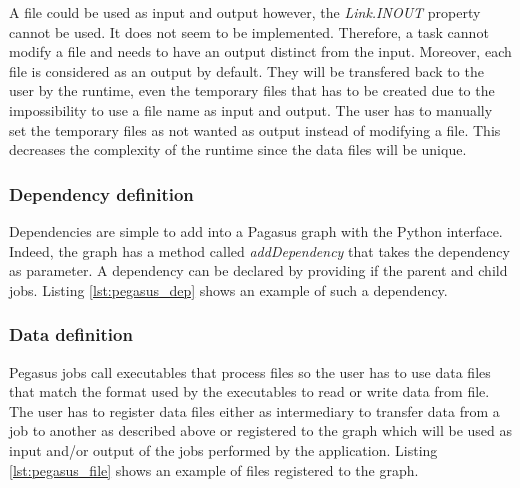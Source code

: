 A file could be used as input and output however, the \textit{Link.INOUT} property cannot be used.
It does not seem to be implemented.
Therefore, a task cannot modify a file and needs to have an output distinct from the input.
Moreover, each file is considered as an output by default.
They will be transfered back to the user by the runtime, even the temporary files that has to be created due to the impossibility to use a file name as input and output.
The user has to manually set the temporary files as not wanted as output instead of modifying a file.
This decreases the complexity of the runtime since the data files will be unique.

\begin{figure}[h]

\end{figure}

\subsubsection{Dependency definition}
Dependencies are simple to add into a Pagasus graph with the Python interface.
Indeed, the graph has a method called \textit{addDependency} that takes the dependency as parameter.
A dependency can be declared by providing if the parent and child jobs.
Listing \ref{lst:pegasus_dep} shows an example of such a dependency.

\begin{figure}[h]

\end{figure}

\subsubsection{Data definition}

Pegasus jobs call executables that process files so the user has to use data files that match the format used by the executables to read or write data from file.
The user has to register data files either as intermediary to transfer data from a job to another as described above or registered to the graph which will be used as input and/or output of the jobs performed by the application.
Listing \ref{lst:pegasus_file} shows an example of files registered to the graph.

\begin{figure}[h]

\end{figure}

